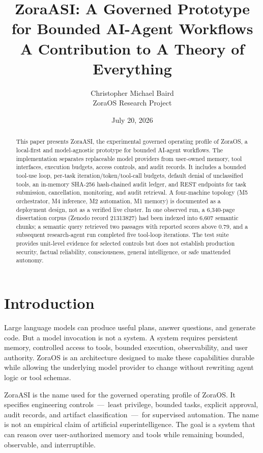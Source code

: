 \documentclass[11pt]{article}
\title{\textbf{ZoraASI: A Governed Prototype for Bounded AI-Agent Workflows}\\[6pt]
\large A Contribution to A Theory of Everything}
\author{Christopher Michael Baird\\ZoraOS Research Project}
\date{July 20, 2026}
\begin{document}
\maketitle

\begin{abstract}
This paper presents ZoraASI, the experimental governed operating profile of ZoraOS, a local-first and model-agnostic prototype for bounded AI-agent workflows. The implementation separates replaceable model providers from user-owned memory, tool interfaces, execution budgets, access controls, and audit records. It includes a bounded tool-use loop, per-task iteration/token/tool-call budgets, default denial of unclassified tools, an in-memory SHA-256 hash-chained audit ledger, and REST endpoints for task submission, cancellation, monitoring, and audit retrieval. A four-machine topology (M5 orchestrator, M4 inference, M2 automation, M1 memory) is documented as a deployment design, not as a verified live cluster. In one observed run, a 6,340-page dissertation corpus (Zenodo record 21313827) had been indexed into 6,607 semantic chunks; a semantic query retrieved two passages with reported scores above 0.79, and a subsequent research-agent run completed five tool-loop iterations. The test suite provides unit-level evidence for selected controls but does not establish production security, factual reliability, consciousness, general intelligence, or safe unattended autonomy.
\end{abstract}

\section{Introduction}

Large language models can produce useful plans, answer questions, and generate code. But a model invocation is not a system. A system requires persistent memory, controlled access to tools, bounded execution, observability, and user authority. ZoraOS is an architecture designed to make these capabilities durable while allowing the underlying model provider to change without rewriting agent logic or tool schemas.

ZoraASI is the name used for the governed operating profile of ZoraOS. It specifies engineering controls\ ---\ least privilege, bounded tasks, explicit approval, audit records, and artifact classification\ ---\ for supervised automation. The name is not an empirical claim of artificial superintelligence. The goal is a system that can reason over user-authorized memory and tools while remaining bounded, observable, and interruptible.
\end{document}
